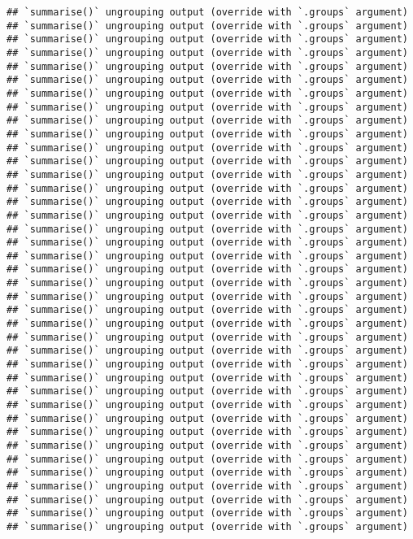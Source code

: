 \documentclass[
]{article}
\begin{document}
\begin{verbatim}
## `summarise()` ungrouping output (override with `.groups` argument)
## `summarise()` ungrouping output (override with `.groups` argument)
## `summarise()` ungrouping output (override with `.groups` argument)
## `summarise()` ungrouping output (override with `.groups` argument)
## `summarise()` ungrouping output (override with `.groups` argument)
## `summarise()` ungrouping output (override with `.groups` argument)
## `summarise()` ungrouping output (override with `.groups` argument)
## `summarise()` ungrouping output (override with `.groups` argument)
## `summarise()` ungrouping output (override with `.groups` argument)
## `summarise()` ungrouping output (override with `.groups` argument)
## `summarise()` ungrouping output (override with `.groups` argument)
## `summarise()` ungrouping output (override with `.groups` argument)
## `summarise()` ungrouping output (override with `.groups` argument)
## `summarise()` ungrouping output (override with `.groups` argument)
## `summarise()` ungrouping output (override with `.groups` argument)
## `summarise()` ungrouping output (override with `.groups` argument)
## `summarise()` ungrouping output (override with `.groups` argument)
## `summarise()` ungrouping output (override with `.groups` argument)
## `summarise()` ungrouping output (override with `.groups` argument)
## `summarise()` ungrouping output (override with `.groups` argument)
## `summarise()` ungrouping output (override with `.groups` argument)
## `summarise()` ungrouping output (override with `.groups` argument)
## `summarise()` ungrouping output (override with `.groups` argument)
## `summarise()` ungrouping output (override with `.groups` argument)
## `summarise()` ungrouping output (override with `.groups` argument)
## `summarise()` ungrouping output (override with `.groups` argument)
## `summarise()` ungrouping output (override with `.groups` argument)
## `summarise()` ungrouping output (override with `.groups` argument)
## `summarise()` ungrouping output (override with `.groups` argument)
## `summarise()` ungrouping output (override with `.groups` argument)
## `summarise()` ungrouping output (override with `.groups` argument)
## `summarise()` ungrouping output (override with `.groups` argument)
## `summarise()` ungrouping output (override with `.groups` argument)
## `summarise()` ungrouping output (override with `.groups` argument)
## `summarise()` ungrouping output (override with `.groups` argument)
## `summarise()` ungrouping output (override with `.groups` argument)
## `summarise()` ungrouping output (override with `.groups` argument)
## `summarise()` ungrouping output (override with `.groups` argument)
## `summarise()` ungrouping output (override with `.groups` argument)
\end{verbatim}
\end{document}
